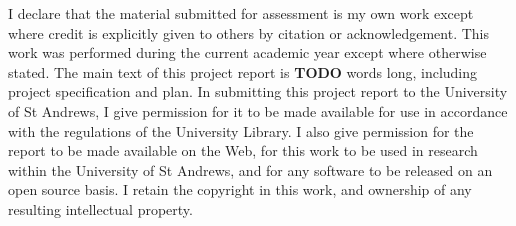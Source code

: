 I declare that the material submitted for assessment is my own work except where credit is explicitly given to others by citation or acknowledgement. This work was performed during the current academic year except where otherwise stated. The main text of this project report is \textbf{TODO} words long, including project specification and plan. In submitting this project report to the University of St Andrews, I give permission for it to be made available for use in accordance with the regulations of the University Library. I also give permission for the report to be made available on the Web, for this work to be used in research within the University of St Andrews, and for any software to be released on an open source basis. I retain the copyright in this work, and ownership of any resulting intellectual property.
